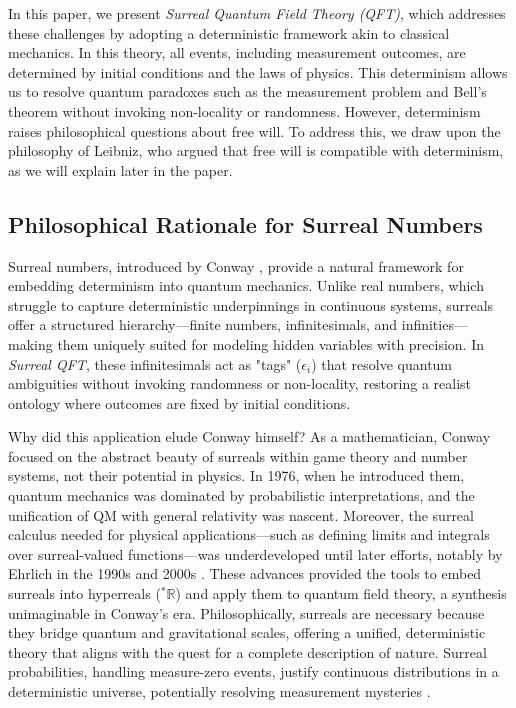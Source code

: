 \documentclass{article}
\begin{document}
In this paper, we present \textit{Surreal Quantum Field Theory (QFT)}, which addresses these challenges by adopting a deterministic framework akin to classical mechanics. In this theory, all events, including measurement outcomes, are determined by initial conditions and the laws of physics. This determinism allows us to resolve quantum paradoxes such as the measurement problem and Bell's theorem without invoking non-locality or randomness. However, determinism raises philosophical questions about free will. To address this, we draw upon the philosophy of Leibniz, who argued that free will is compatible with determinism, as we will explain later in the paper.

\subsection{Philosophical Rationale for Surreal Numbers}
Surreal numbers, introduced by Conway \cite{Conway1976}, provide a natural framework for embedding determinism into quantum mechanics. Unlike real numbers, which struggle to capture deterministic underpinnings in continuous systems, surreals offer a structured hierarchy---finite numbers, infinitesimals, and infinities---making them uniquely suited for modeling hidden variables with precision. In \textit{Surreal QFT}, these infinitesimals act as "tags" (\(\epsilon_i\)) that resolve quantum ambiguities without invoking randomness or non-locality, restoring a realist ontology where outcomes are fixed by initial conditions.

Why did this application elude Conway himself? As a mathematician, Conway focused on the abstract beauty of surreals within game theory and number systems, not their potential in physics. In 1976, when he introduced them, quantum mechanics was dominated by probabilistic interpretations, and the unification of QM with general relativity was nascent. Moreover, the surreal calculus needed for physical applications---such as defining limits and integrals over surreal-valued functions---was underdeveloped until later efforts, notably by Ehrlich in the 1990s and 2000s \cite{Ehrlich2012}. These advances provided the tools to embed surreals into hyperreals (\({}^*\mathbb{R}\)) and apply them to quantum field theory, a synthesis unimaginable in Conway's era. Philosophically, surreals are necessary because they bridge quantum and gravitational scales, offering a unified, deterministic theory that aligns with the quest for a complete description of nature. Surreal probabilities, handling measure-zero events, justify continuous distributions in a deterministic universe, potentially resolving measurement mysteries \cite{Pruss2010}.
\end{document}
